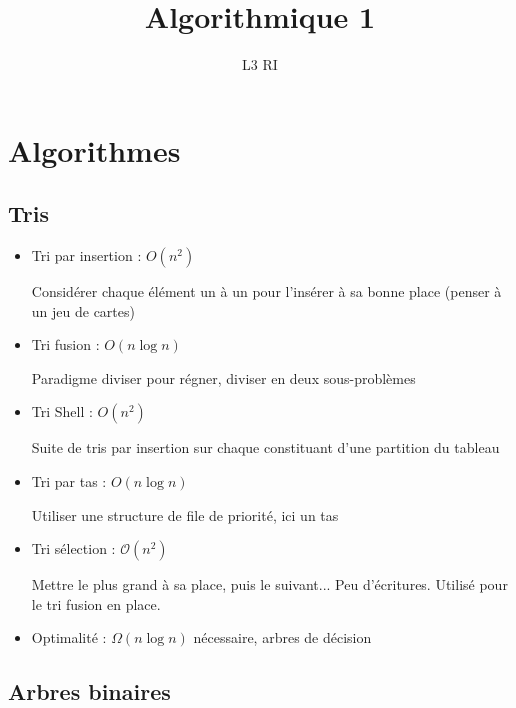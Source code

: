 \documentclass[10pt,a4paper]{article}
\begin{document}
\title{Algorithmique 1}
\author{L3 RI}
\date{}

\maketitle

\tableofcontents


\section{Algorithmes}

\subsection{Tris}

%
\begin{itemize}[noitemsep]
	\item Tri par insertion : \(  O(n^2)  \)
		
		Considérer chaque élément un à un pour l'insérer à sa bonne place (penser à un jeu de cartes)
		
	\item Tri fusion : \(  O(n\log n)  \)
		
		Paradigme diviser pour régner, diviser en deux sous-problèmes
	\item Tri Shell : \(  O(n^2)  \)
	
		Suite de tris par insertion sur chaque constituant d'une partition du tableau
		
	\item Tri par tas : \(  O(n\log n)  \)
	
		Utiliser une structure de file de priorité, ici un tas
	
        \item Tri sélection : $\mathcal{O}(n^2)$ %

                Mettre le plus grand à sa place, puis le suivant... Peu d'écritures. Utilisé pour le tri fusion en place.

        \item Optimalité : \(  \Omega (n \log n)  \) nécessaire, arbres de décision
\end{itemize}
%



\subsection{Arbres binaires}
\end{document}
